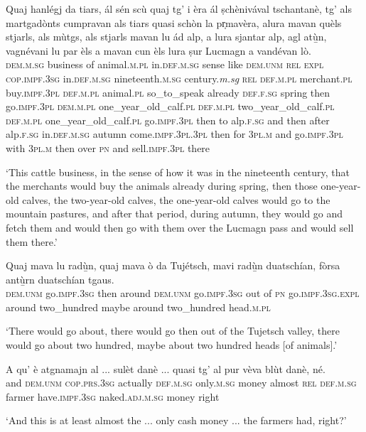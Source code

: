 \begin{linenumbers}
\gll Quaj hanlégj da tiars, ál sén scù quaj tg' i èra ál ṣchènivával tschantanè, tg' als martgadònts cumpravan als tiars quasi schòn la pr̩mavèra, alura mavan quèls stjarls, als mùtgs, als stjarls mavan lu ád alp, a lura sjantar alp, agl atù̱n, vagnévani lu par èls a mavan cun èls lura ṣur Lucmagn a vandévan lò.\\
\textsc{dem.m.sg} business of animal.\textsc{m.pl} in.\textsc{def.m.sg} sense like \textsc{dem.unm} \textsc{rel} \textsc{expl} \textsc{cop.impf.3sg} in.\textsc{def.m.sg} nineteenth.\textsc{m.sg} century.\textit{m.sg} \textsc{rel} \textsc{def.m.pl} merchant.\textsc{pl} buy.\textsc{impf.3pl} \textsc{def.m.pl} animal.\textsc{pl} so\_to\_speak already \textsc{def.f.sg} spring then go.\textsc{impf.3pl} \textsc{dem.m.pl} one\_year\_old\_calf.\textsc{pl} \textsc{def.m.pl} two\_year\_old\_calf.\textsc{pl} \textsc{def.m.pl} one\_year\_old\_calf.\textsc{pl} go.\textsc{impf.3pl} then to alp.\textsc{f.sg} and then after alp.\textsc{f.sg} in.\textsc{def.m.sg} autumn come.\textsc{impf.3pl.3pl} then for \textsc{3pl.m} and go.\textsc{impf.3pl} with \textsc{3pl.m} then over \textsc{pn} and sell.\textsc{impf.3pl} there\\
\end{linenumbers}
\medskip
\glt`This cattle business, in the sense of how it was in the nineteenth century, that the merchants would buy the animals already during spring, then those one-year-old calves, the two-year-old calves, the one-year-old calves would go to the mountain pastures, and after that period, during autumn, they would go and fetch them and would then go with them over the Lucmagn pass and would sell them there.'
\medskip

\largerpage[2]
\begin{linenumbers}
\gll Quaj mava lu radù̱n, quaj mava ò da Tujétsch, mavi radù̱n duatschían, fòrsa antù̱rn duatschían tgaus.\\
\textsc{dem.unm} go.\textsc{impf.3sg} then around \textsc{dem.unm} go.\textsc{impf.3sg} out of \textsc{pn} go.\textsc{impf.3sg.expl} around two\_hundred maybe around two\_hundred head.\textsc{m.pl}\\
\end{linenumbers}
\medskip
\glt `There would go about, there would go then out of the Tujetsch valley, there would go about two hundred, maybe about two hundred heads [of animals].'
\medskip

\begin{linenumbers}
\gll A qu’ è atgnamajn al ... sulèt danè ... quasi tg’ al pur vèva blùt danè, né.\\
and \textsc{dem.unm} \textsc{cop.prs.3sg} actually \textsc{def.m.sg} {} only.\textsc{m.sg} money {} almost \textsc{rel} \textsc{def.m.sg} farmer have.\textsc{impf.3sg} naked.\textsc{adj.m.sg} money right \\ 
\end{linenumbers}
\smallskip
\glt `And this is at least almost the ... only cash money ... the farmers had, right?'

